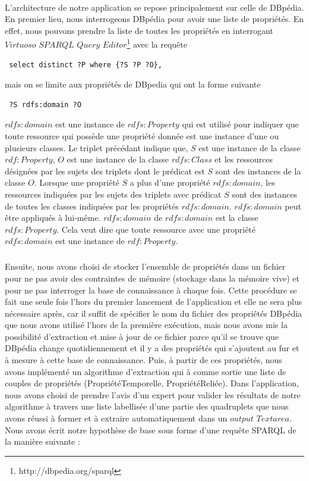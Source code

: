 \paragraph{}
L'architecture de notre application se repose principalement sur celle de DBpédia. En premier lieu, nous interrogeons DBpédia pour avoir une liste de propriétés. En effet, nous pouvons prendre la liste de toutes les propriétés en interrogant $Virtuoso$ $SPARQL$ $Query$ $Editor$\footnote{http://dbpedia.org/sparql}  avec la requête \begin{verbatim} select distinct ?P where {?S ?P ?O},\end{verbatim}mais on se limite aux propriétés de DBpedia qui ont la forme suivante \begin{verbatim} ?S rdfs:domain ?O \end{verbatim} $rdfs:domain$ est une instance de $rdfs:Property$ qui est utilisé pour indiquer que toute ressource qui possède une propriété donnée est une instance d'une ou plusieurs classes. Le triplet précédant indique que, $S$ est une instance de la classe $rdf:Property$, $O$ est une instance de la classe $rdfs:Class$ et les ressources désignées par les sujets des triplets dont le prédicat est $S$ sont des instances de la classe $O$. Lorsque une propriété $S$ a plus d'une propriété $rdfs:domain$, les ressources indiquées par les sujets des triplets avec prédicat $S$ sont des instances de toutes les classes indiquées par les propriétés $rdfs:domain$. $rdfs:domain$ peut être appliqués à lui-même. $rdfs:domain$ de $rdfs:domain$ est la classe $rdfs:Property$. Cela veut dire que toute ressource avec une propriété $rdfs:domain$ est une instance de $rdf:Property$. 
\subparagraph{}
Ensuite, nous avons choisi de stocker l'ensemble de propriétés dans un fichier pour ne pas avoir des contraintes de mémoire (stockage dans la mémoire vive) et pour ne pas interroger la base de connaissance à chaque fois. Cette procédure se fait une seule fois l'hors du premier lancement de l'application et elle ne sera plus nécessaire après, car il suffit de spécifier le nom du fichier des propriétés DBpédia que nous avons utilisé l'hors de la première exécution, mais nous avons mis la possibilité d'extraction et mise à jour de ce fichier parce qu'il se trouve que DBpédia change quotidiennement et il y a des propriétés qui s'ajoutent au fur et à mesure à cette base de connaissance. Puis, à partir de ces propriétés, nous avons implémenté un algorithme d'extraction qui à comme sortie une liste de couples de propriétés (PropriétéTemporelle, PropriétéReliée). Dans l'application, nous avons choisi de prendre l'avis d'un expert pour valider les résultats de notre algorithme à travers une liste labellisée d'une partie des quadruplets que nous avons réussi à former et à extraire automatiquement dans un $output$ $Textarea$. Nous avons écrit notre hypothèse de base sous forme d'une requête SPARQL de la manière suivante :
